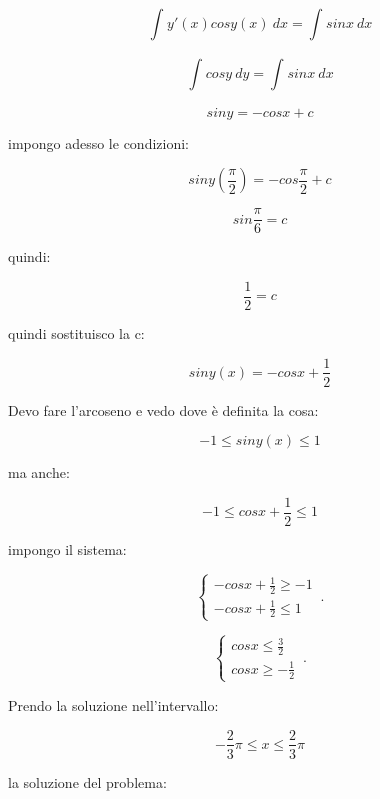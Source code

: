 \documentclass[11pt]{article}
\begin{document}
\[
    \int_{}^{} {y'(x) cosy(x)} \: dx = \int_{}^{} {sinx} \: dx 
\]

\[
    \int_{}^{} {cosy} \: dy = \int_{}^{} {sinx} \: dx 
\]

\[
    sin y = -cos x +c
\]

impongo adesso le condizioni:

\[
    sin y( \frac{\pi}{2}) = - cos \frac{\pi}{2} + c
\]

\[
    sin \frac{\pi}{6} = c
\]

quindi:

\[
    \frac{1}{2}=c
\]

quindi sostituisco la c:

\[
    sin y(x) = - cos x + \frac{1}{2}
\]

Devo fare l'arcoseno e vedo dove è definita la cosa:

\[
    -1 \le sin y(x) \le 1
\]

ma anche:

\[
    -1 \le cosx + \frac{1}{2} \le 1
\]

impongo il sistema:

    \begin{equation}
        \begin{cases}
            -cosx +\frac{1}{2}\ge -1\\
            -cos x + \frac{1}{2} \le 1
        \end{cases}\,.
    \end{equation}

    \begin{equation}
        \begin{cases}
            cosx \le  \frac{3}{2}\\
            cosx \ge -\frac{1}{2}
        \end{cases}\,.
    \end{equation}


Prendo la soluzione nell'intervallo:

\[
    -\frac{2}{3}\pi \le  x \le  \frac{2}{3}\pi
\]

la soluzione del problema: 
\end{document}
